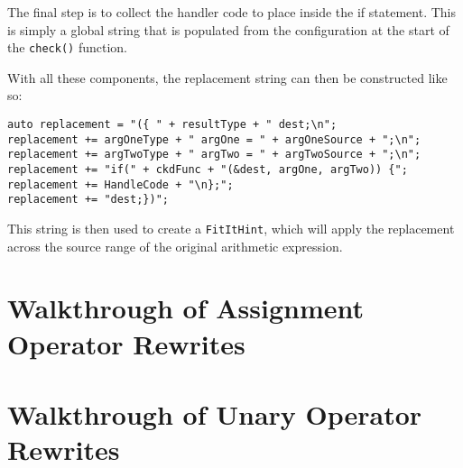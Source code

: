 The final step is to collect the handler code to place inside the if statement. This is simply a global string that is populated from the configuration at the start of the \texttt{check()} function.

With all these components, the replacement string can then be constructed like so:
\begin{center}
\parbox{0.99\linewidth}{
\texttt{auto replacement = "(\{ " + resultType + " dest;\textbackslash n";\\
replacement += argOneType + " argOne = " + argOneSource + ";\textbackslash n";\\
replacement += argTwoType + " argTwo = " + argTwoSource + ";\textbackslash n";\\
replacement += "if(" + ckdFunc + "(\&dest, argOne, argTwo)) \{";\\
replacement += HandleCode + "\textbackslash n\};";\\
replacement += "dest;\})";}
}
\end{center}

This string is then used to create a \texttt{FitItHint}, which will apply the replacement across the source range of the original arithmetic expression.

\section{Walkthrough of Assignment Operator Rewrites}

\section{Walkthrough of Unary Operator Rewrites}